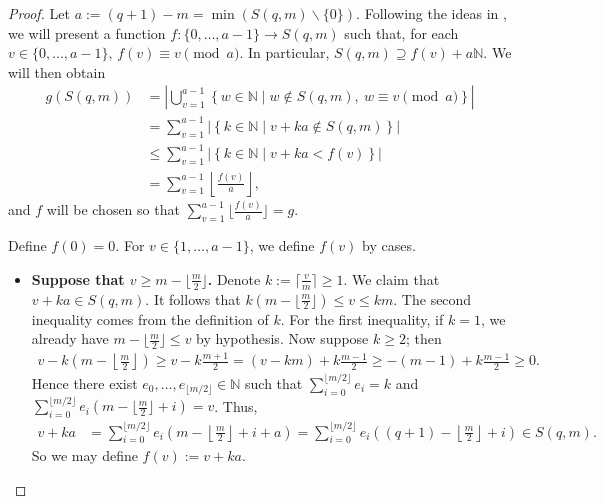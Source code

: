 \documentclass[12pt]{amsart}
\theoremstyle{remark}
\theoremstyle{definition}
\newcommand{\coloneqq}{\mathrel{:=}}
\begin{document}
\begin{proof}
    Let $a \coloneqq (q+1)-m = \min\left(S(q,m) \smallsetminus \{0\}\right)$.
    Following the ideas in \cite{AlgorithmFrobeniusTree}, we will present a
    function $f \colon \{0,\ldots,a-1\} \to S(q,m)$ such that, for each
    $v \in \{0,\ldots,a-1\}$, $f(v) \equiv v \pmod{a}$. In particular,
    $S(q,m) \supseteq f(v) + a\mathbb{N}$. We will then obtain
    \begin{align*}
        g\left(S(q,m)\right)
        &= \left|\bigcup_{v=1}^{a-1}
           \left\{ w \in \mathbb{N} \mid w \notin S(q,m),\
           w \equiv v \pmod{a} \right\}\right| \\
        &= \sum_{v=1}^{a-1}
           \left|\left\{ k \in \mathbb{N} \mid v+ka \notin S(q,m)
           \right\}\right| \\
        &\le \sum_{v=1}^{a-1}
             \left|\left\{ k \in \mathbb{N} \mid v+ka < f(v)
             \right\}\right| \\
        &= \sum_{v=1}^{a-1} \left\lfloor \frac{f(v)}{a} \right\rfloor,
    \end{align*}
    and $f$ will be chosen so that
    $\sum_{v=1}^{a-1}\lfloor\frac{f(v)}{a}\rfloor = g$.
    

    Define $f(0) = 0$. For $v \in \{1,\ldots,a-1\}$, we define $f(v)$
    by cases.

    \begin{itemize}
        \item \textbf{Suppose that $v \ge m - \lfloor\frac{m}{2}\rfloor$.}
        Denote $k \coloneqq \lceil\frac{v}{m}\rceil \ge 1$.
        We claim that $v + ka \in S(q,m)$.
        It follows that
        $k\!\left(m-\lfloor\tfrac{m}{2}\rfloor\right) \le v \le km$.
        The second inequality comes from the definition of $k$.
        For the first inequality, if $k=1$, we already have
        $m - \lfloor\frac{m}{2}\rfloor \le v$ by hypothesis.
        Now suppose $k \ge 2$; then
        \begin{align*}
            v - k\!\left(m-\left\lfloor\tfrac{m}{2}\right\rfloor\right)
            \ge v - k\tfrac{m+1}{2}
            = (v-km) + k\tfrac{m-1}{2}
            \ge -(m-1) + k\tfrac{m-1}{2} \ge 0.
        \end{align*}
        Hence there exist $e_0, \ldots, e_{\lfloor m/2 \rfloor} \in \mathbb{N}$
        such that $\sum_{i=0}^{\lfloor m/2 \rfloor} e_i = k$ and
        $\sum_{i=0}^{\lfloor m/2 \rfloor} e_i
        \!\left(m - \lfloor\tfrac{m}{2}\rfloor + i\right) = v$.
        Thus,
        \begin{align*}
            v + ka
            &= \sum_{i=0}^{\lfloor m/2 \rfloor} e_i
               \!\left(m - \left\lfloor\tfrac{m}{2}\right\rfloor + i + a\right)
             = \sum_{i=0}^{\lfloor m/2 \rfloor} e_i
               \!\left((q+1) - \left\lfloor\tfrac{m}{2}\right\rfloor + i\right)
             \in S(q,m).
        \end{align*}
        So we may define $f(v) \coloneqq v + ka$.


\end{itemize}
\end{proof}
\end{document}

